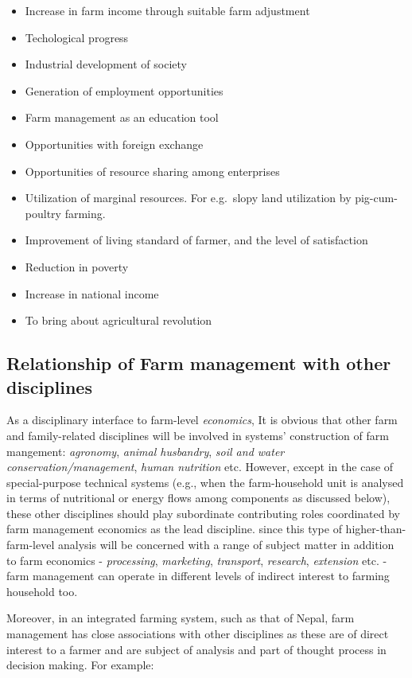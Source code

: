 \documentclass[11pt,]{book}
\providecommand{\tightlist}{%
  \setlength{\itemsep}{0pt}\setlength{\parskip}{0pt}}
\theoremstyle{definition}
\theoremstyle{definition}
\theoremstyle{definition}
\theoremstyle{remark}
\begin{document}
\begin{itemize}
\tightlist
\item
  Increase in farm income through suitable farm adjustment
\item
  Techological progress
\item
  Industrial development of society
\item
  Generation of employment opportunities
\item
  Farm management as an education tool
\item
  Opportunities with foreign exchange
\item
  Opportunities of resource sharing among enterprises
\item
  Utilization of marginal resources. For e.g.~slopy land utilization by
  pig-cum-poultry farming.
\item
  Improvement of living standard of farmer, and the level of
  satisfaction
\item
  Reduction in poverty
\item
  Increase in national income
\item
  To bring about agricultural revolution
\end{itemize}

\subsection{Relationship of Farm management with other
disciplines}\label{relationship-of-farm-management-with-other-disciplines}

As a disciplinary interface to farm-level \emph{economics}, It is
obvious that other farm and family-related disciplines will be involved
in systems' construction of farm mangement: \emph{agronomy},
\emph{animal husbandry}, \emph{soil and water conservation/management},
\emph{human nutrition} etc. However, except in the case of
special-purpose technical systems (e.g., when the farm-household unit is
analysed in terms of nutritional or energy flows among components as
discussed below), these other disciplines should play subordinate
contributing roles coordinated by farm management economics as the lead
discipline. since this type of higher-than-farm-level analysis will be
concerned with a range of subject matter in addition to farm economics -
\emph{processing}, \emph{marketing}, \emph{transport}, \emph{research},
\emph{extension} etc. - farm management can operate in different levels
of indirect interest to farming household too.

Moreover, in an integrated farming system, such as that of Nepal, farm
management has close associations with other disciplines as these are of
direct interest to a farmer and are subject of analysis and part of
thought process in decision making. For example:
\end{document}
